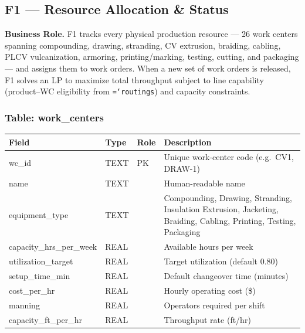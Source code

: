 \documentclass[11pt]{article}
\newcommand{\tfield}[1]{\texttt{\hyphenchar\font=`\-\relax #1}}
\begin{document}
\subsection{F1 --- Resource Allocation \& Status}

\textbf{Business Role.}
F1 tracks every physical production resource --- 26 work centers spanning compounding, drawing, stranding, CV extrusion, braiding, cabling, PLCV vulcanization, armoring, printing/marking, testing, cutting, and packaging --- and assigns them to work orders.  When a new set of work orders is released, F1 solves an LP to maximize total throughput subject to line capability (product--WC eligibility from \tfield{routings}) and capacity constraints.

\subsubsection*{Table: work\_centers}
\begin{table}[H]\centering\small
\begin{tabular}{@{} l l l L{6cm} @{}}
\toprule
\textbf{Field} & \textbf{Type} & \textbf{Role} & \textbf{Description} \\
\midrule
wc\_id          & TEXT    & PK  & Unique work-center code (e.g.\ CV1, DRAW-1) \\
name            & TEXT    &     & Human-readable name \\
equipment\_type & TEXT    &     & Compounding, Drawing, Stranding, Insulation Extrusion, Jacketing, Braiding, Cabling, Printing, Testing, Packaging \\
capacity\_hrs\_per\_week & REAL & & Available hours per week \\
utilization\_target & REAL &   & Target utilization (default 0.80) \\
setup\_time\_min & REAL   &     & Default changeover time (minutes) \\
cost\_per\_hr   & REAL    &     & Hourly operating cost (\$) \\
manning         & REAL    &     & Operators required per shift \\
capacity\_ft\_per\_hr & REAL & & Throughput rate (ft/hr) \\
\bottomrule
\end{tabular}
\end{table}
\end{document}
